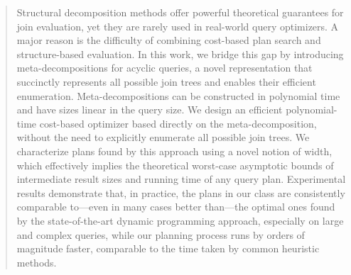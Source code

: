 \begin{abstract}
Structural decomposition methods offer powerful theoretical guarantees for join evaluation, yet they are rarely used in real-world query optimizers. A major reason is the difficulty of combining cost-based plan search and structure-based evaluation. In this work, we bridge this gap by introducing meta-decompositions for acyclic queries, a novel representation that succinctly represents all possible join trees and enables their efficient enumeration. Meta-decompositions can be constructed in polynomial time and have sizes linear in the query size. We design an efficient polynomial-time cost-based optimizer based directly on the meta-decomposition, without the need to explicitly enumerate all possible join trees. We characterize plans found by this approach using a novel notion of width, which effectively implies the theoretical worst-case asymptotic bounds of intermediate result sizes and running time of any query plan. Experimental results demonstrate that, in practice, the plans in our class are consistently comparable to---even in many cases better than---the optimal ones found by the state-of-the-art dynamic programming approach, especially on large and complex queries, while our planning process runs by orders of magnitude faster, comparable to the time taken by common heuristic methods. 
\end{abstract}